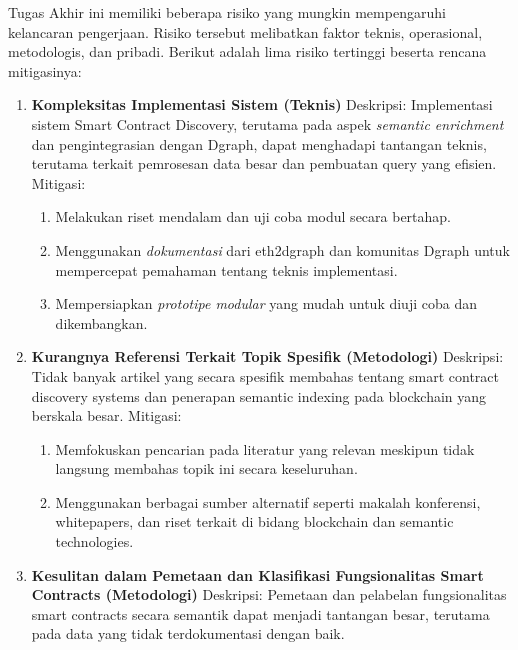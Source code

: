 Tugas Akhir ini memiliki beberapa risiko yang mungkin mempengaruhi kelancaran pengerjaan. Risiko tersebut melibatkan faktor teknis, operasional, metodologis, dan pribadi. Berikut adalah lima risiko tertinggi beserta rencana mitigasinya:

\begin{enumerate}
	\item \textbf{Kompleksitas Implementasi Sistem (Teknis)} \newline
	      Deskripsi: Implementasi sistem Smart Contract Discovery, terutama pada aspek \textit{semantic enrichment} dan pengintegrasian dengan Dgraph, dapat menghadapi tantangan teknis, terutama terkait pemrosesan data besar dan pembuatan query yang efisien. \newline
	      Mitigasi:
	      \begin{enumerate}
		      \item Melakukan riset mendalam dan uji coba modul secara bertahap.
		      \item Menggunakan \textit{dokumentasi} dari eth2dgraph dan komunitas Dgraph untuk mempercepat pemahaman tentang teknis implementasi.
		      \item Mempersiapkan \textit{prototipe modular} yang mudah untuk diuji coba dan dikembangkan.
	      \end{enumerate}
	\item \textbf{Kurangnya Referensi Terkait Topik Spesifik (Metodologi)} \newline
	      Deskripsi: Tidak banyak artikel yang secara spesifik membahas tentang smart contract discovery systems dan penerapan semantic indexing pada blockchain yang berskala besar.  \newline
	      Mitigasi:
	      \begin{enumerate}
		      \item Memfokuskan pencarian pada literatur yang relevan meskipun tidak langsung membahas topik ini secara keseluruhan.
		      \item Menggunakan berbagai sumber alternatif seperti makalah konferensi, whitepapers, dan riset terkait di bidang blockchain dan semantic technologies.
	      \end{enumerate}
	\item \textbf{Kesulitan dalam Pemetaan dan Klasifikasi Fungsionalitas Smart Contracts (Metodologi)}  \newline
	      Deskripsi: Pemetaan dan pelabelan fungsionalitas smart contracts secara semantik dapat menjadi tantangan besar, terutama pada data yang tidak terdokumentasi dengan baik. \newline

\end{enumerate}

